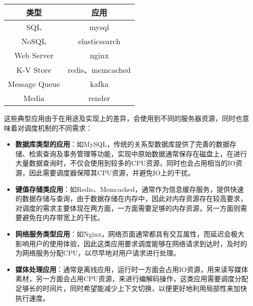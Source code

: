 \begin{table}[!htbp]
    \label{tab:typical_application} 
    \footnotesize%
    \setlength{\tabcolsep}{4pt}%
    \renewcommand{\arraystretch}{1.25}%
    \centering
    \begin{tabular}{cc}
        \hline
        类型 & 应用\\
        \hline
        SQL & mysql\\
        NoSQL & elasticsearch\\
        Web Server & nginx\\
        K-V Store & redis、memcached\\
        Message Queue & kafka\\
        Media & render\\
        \hline
    \end{tabular}
\end{table}

这些典型应用由于在用途及实现上的差异，会使用到不同的服务器资源，同时也意味着对调度机制的不同需求：

\begin{itemize}

    \item \textbf{数据库类型的应用}：如MySQL，传统的关系型数据库提供了完善的数据存储、检索查询及事务管理等功能，实现中原始数据通常保存在磁盘上，在进行大量数据查询时，不仅会使用到较多的CPU资源，同时也会占用相当的IO资源，因此需要调度器保障其CPU资源，并避免IO上的干扰。

    \item \textbf{键值存储类应用}：如Redis、Memcached，通常作为信息缓存服务，提供快速的数据存储与查询，由于数据存储在内存中，因此对内存资源存在较高要求，对调度的需求主要体现在两方面，一方面需要足够的内存资源，另一方面则需要避免在内存带宽上的干扰。

    \item \textbf{网络服务类型应用}：如Nginx，网络页面通常都具有交互属性，而延迟会极大影响用户的使用体验，因此这类应用要求调度能够在网络请求到达时，及时的为网络服务分配CPU，以尽早地对用户请求进行处理。

    \item \textbf{媒体处理应用}：通常是离线应用，运行时一方面会占用IO资源，用来读写媒体素材，另一方面会占用CPU资源，来进行编解码操作，这类应用需要调度分配足够长的时间片，同时希望能减少上下文切换，以便更好地利用局部性来加快执行速度。

\end{itemize}

